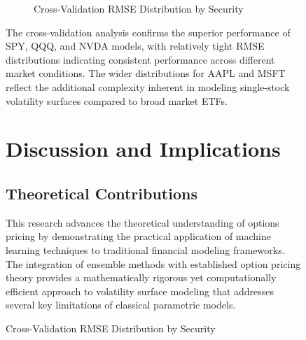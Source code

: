 \documentclass[12pt,a4paper]{article}
\begin{document}
\begin{figure}[H]
\begin{figure}[H]
\centering
{}
\caption{Cross-Validation RMSE Distribution by Security}
\label{fig:model_validation}
\end{figure}

The cross-validation analysis confirms the superior performance of SPY, QQQ, and NVDA models, with relatively tight RMSE distributions indicating consistent performance across different market conditions. The wider distributions for AAPL and MSFT reflect the additional complexity inherent in modeling single-stock volatility surfaces compared to broad market ETFs.

\section{Discussion and Implications}

\subsection{Theoretical Contributions}

This research advances the theoretical understanding of options pricing by demonstrating the practical application of machine learning techniques to traditional financial modeling frameworks. The integration of ensemble methods with established option pricing theory provides a mathematically rigorous yet computationally efficient approach to volatility surface modeling that addresses several key limitations of classical parametric models.


\end{figure}
\end{document}
